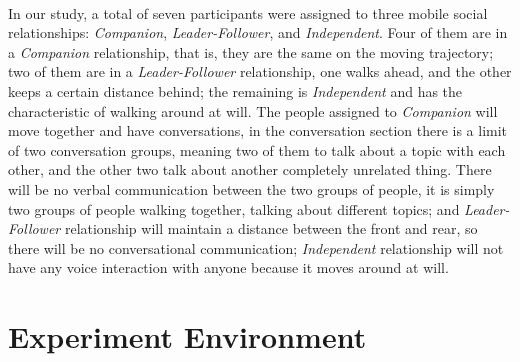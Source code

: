 \documentclass[a4paper,12pt]{report}
\begin{document}
\paragraph{}
In our study, a total of seven participants were assigned to three mobile social relationships: \emph{Companion}, \emph{Leader-Follower}, and \emph{Independent}. Four of them are in a \emph{Companion} relationship, that is, they are the same on the moving trajectory; two of them are in a \emph{Leader-Follower} relationship, one walks ahead, and the other keeps a certain distance behind; the remaining is \emph{Independent} and has the characteristic of walking around at will. The people assigned to \emph{Companion} will move together and have conversations, in the conversation section there is a limit of two conversation groups, meaning two of them to talk about a topic with each other, and the other two talk about another completely unrelated thing. There will be no verbal communication between the two groups of people, it is simply two groups of people walking together, talking about different topics; and \emph{Leader-Follower} relationship will maintain a distance between the front and rear, so there will be no conversational communication; \emph{Independent} relationship will not have any voice interaction with anyone because it moves around at will.
\section{Experiment Environment}
\end{document}
